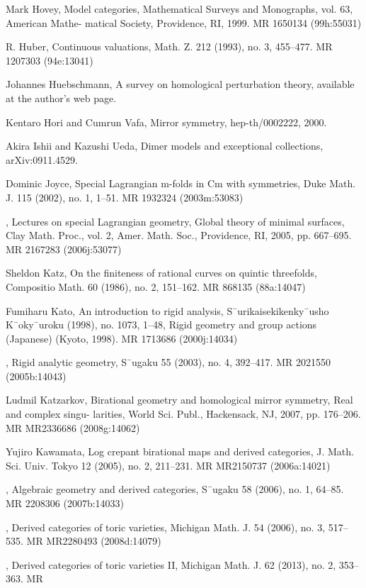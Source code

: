 {\begin{list}{}{%
  \setlength{\leftmargin}{3.4em}%
  \setlength{\itemindent}{-3.4em}%
  \setlength{\itemsep}{1.5pt}%
  \setlength{\parsep}{0pt}%
  \setlength{\listparindent}{0pt}%
}
\item[{[Hov99]}] Mark Hovey, Model categories, Mathematical Surveys and Monographs, vol. 63, American Mathe- matical Society, Providence, RI, 1999. MR 1650134 (99h:55031)
\item[{[Hub93]}] R. Huber, Continuous valuations, Math. Z. 212 (1993), no. 3, 455--477. MR 1207303 (94e:13041)
\item[{[Hue]}] Johannes Huebschmann, A survey on homological perturbation theory, available at the author’s web page.
\item[{[HV00]}] Kentaro Hori and Cumrun Vafa, Mirror symmetry, hep-th/0002222, 2000.
\item[{[IU]}] Akira Ishii and Kazushi Ueda, Dimer models and exceptional collections, arXiv:0911.4529.
\item[{[Joy02]}] Dominic Joyce, Special Lagrangian m-folds in Cm with symmetries, Duke Math. J. 115 (2002), no. 1, 1--51. MR 1932324 (2003m:53083)
\item[{[Joy05]}] , Lectures on special Lagrangian geometry, Global theory of minimal surfaces, Clay Math. Proc., vol. 2, Amer. Math. Soc., Providence, RI, 2005, pp. 667--695. MR 2167283 (2006j:53077)
\item[{[Kat86]}] Sheldon Katz, On the finiteness of rational curves on quintic threefolds, Compositio Math. 60 (1986), no. 2, 151--162. MR 868135 (88a:14047)
\item[{[Kat98]}] Fumiharu Kato, An introduction to rigid analysis, S¯urikaisekikenky¯usho K¯oky¯uroku (1998), no. 1073, 1--48, Rigid geometry and group actions (Japanese) (Kyoto, 1998). MR 1713686 (2000j:14034)
\item[{[Kat03]}] , Rigid analytic geometry, S¯ugaku 55 (2003), no. 4, 392--417. MR 2021550 (2005b:14043)
\item[{[Kat07]}] Ludmil Katzarkov, Birational geometry and homological mirror symmetry, Real and complex singu- larities, World Sci. Publ., Hackensack, NJ, 2007, pp. 176--206. MR MR2336686 (2008g:14062)
\item[{[Kaw05]}] Yujiro Kawamata, Log crepant birational maps and derived categories, J. Math. Sci. Univ. Tokyo 12 (2005), no. 2, 211--231. MR MR2150737 (2006a:14021)
\item[{[Kaw06a]}] , Algebraic geometry and derived categories, S¯ugaku 58 (2006), no. 1, 64--85. MR 2208306 (2007b:14033)
\item[{[Kaw06b]}] , Derived categories of toric varieties, Michigan Math. J. 54 (2006), no. 3, 517--535. MR MR2280493 (2008d:14079)
\item[{[Kaw13]}] , Derived categories of toric varieties II, Michigan Math. J. 62 (2013), no. 2, 353--363. MR

\end{list}}
